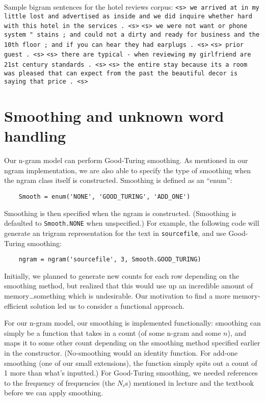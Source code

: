 \documentclass{article}
\begin{document}
Sample bigram sentences for the hotel reviews corpus:\npar
\texttt{<s> we arrived at in my little lost and advertised as inside and we did inquire whether hard with this hotel in the services . <s>}\npar
\texttt{<s> we were not want or phone system " stains ; and could not a dirty and ready for business and the 10th floor ; and if you can hear they had earplugs . <s>}\npar
\texttt{<s> prior guest . <s>}\npar
\texttt{<s> there are typical - when reviewing my girlfriend are 21st century standards . <s>}\npar
\texttt{<s> the entire stay because its a room was pleased that can expect from the past the beautiful decor is saying that price . <s>}\npar

\fi

\section{Smoothing and unknown word handling}

Our n-gram model can perform Good-Turing smoothing. As mentioned in our ngram implementation, we are also able to specify the type of smoothing when the ngram class itself is constructed. Smoothing is defined as an ``enum'':

{\small\begin{verbatim}
    Smooth = enum('NONE', 'GOOD_TURING', 'ADD_ONE')
\end{verbatim}}

Smoothing is then specified when the ngram is constructed. (Smoothing is defaulted to \texttt{Smooth.NONE} when unspecified.) For example, the following code will generate an trigram representation for the text in \texttt{sourcefile}, and use Good-Turing smoothing:
{\small\begin{verbatim}
    ngram = ngram('sourcefile', 3, Smooth.GOOD_TURING)
\end{verbatim}}

Initially, we planned to generate new counts for each row depending on the smoothing method, but realized that this would use up an incredible amount of memory\ldots something which is undesirable. Our motivation to find a more memory-efficient solution led us to consider a functional approach.\par
For our n-gram model, our smoothing is implemented functionally: smoothing can simply be a function that takes in a count (of some n-gram and some $n$), and maps it to some other count depending on the smoothing method specified earlier in the constructor. (No-smoothing would an identity function. For add-one smoothing (one of our small extensions), the function simply spits out a count of 1 more than what's inputted.) For Good-Turing smoothing, we needed references to the frequency of frequencies (the $N_c$s) mentioned in lecture and the textbook before we can apply smoothing.\par
\end{document}
